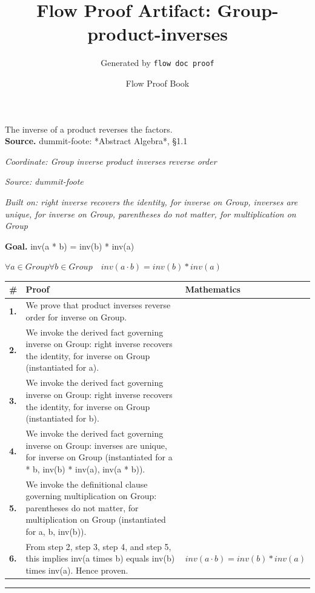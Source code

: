 \documentclass[11pt]{article}
\title{Flow Proof Artifact: Group-product-inverses}
\author{Generated by \texttt{flow doc proof}}
\date{Flow Proof Book}
\theoremstyle{definition}
\begin{document}
\maketitle
The inverse of a product reverses the factors.\\[0.5em]
\textbf{Source.} dummit-foote: *Abstract Algebra*, §1.1\\[0.5em]
\bigskip
{}\par
\smallskip\noindent\textit{Coordinate: Group \cdot inverse \cdot product inverses reverse order}\par
\smallskip\noindent\textit{Source: dummit-foote}\par
\smallskip\noindent\textit{Built on: right inverse recovers the identity, for inverse on Group, inverses are unique, for inverse on Group, parentheses do not matter, for multiplication on Group}\par
\medskip
\noindent\textbf{Goal.} inv(a * b) = inv(b) * inv(a)\par
\noindent$\displaystyle \forall a \in Group \forall b \in Group\quad inv(a \cdot b) = inv(b) * inv(a)$\par
\medskip
\noindent
\begin{tabular}{@{} >{\raggedright\arraybackslash}p{} >{\raggedright\arraybackslash}p{} >{\raggedleft\arraybackslash}p{} @{}}
\textbf{\#} & \textbf{Proof} & \textbf{Mathematics} \\
\midrule
\textbf{1.} & We prove that product inverses reverse order for inverse on Group. & \\[0.45em]
\textbf{2.} & We invoke the derived fact governing inverse on Group: right inverse recovers the identity, for inverse on Group (instantiated for a). & \\[0.45em]
\textbf{3.} & We invoke the derived fact governing inverse on Group: right inverse recovers the identity, for inverse on Group (instantiated for b). & \\[0.45em]
\textbf{4.} & We invoke the derived fact governing inverse on Group: inverses are unique, for inverse on Group (instantiated for a * b, inv(b) * inv(a), inv(a * b)). & \\[0.45em]
\textbf{5.} & We invoke the definitional clause governing multiplication on Group: parentheses do not matter, for multiplication on Group (instantiated for a, b, inv(b)). & \\[0.45em]
\textbf{6.} & From step 2, step 3, step 4, and step 5, this implies inv(a times b) equals inv(b) times inv(a). Hence proven. & $\displaystyle inv(a \cdot b) = inv(b) * inv(a)$ \\[0.45em]
\bottomrule
\end{tabular}
\label{thm:Group-inverse-product_inverses_reverse_order}
\par\medskip\hrule
\end{document}
